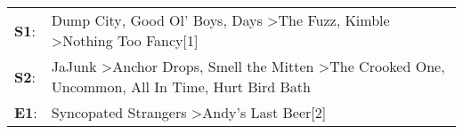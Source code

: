 \begin{supertabular}{p{0.03\textwidth}p{0.92\textwidth}}
 \textbf{S1}:  &                                                  Dump City\textsuperscript{}, \enspace Good Ol' Boys\textsuperscript{},  Days\textsuperscript{} \textgreater \enspace The Fuzz\textsuperscript{}, \enspace Kimble\textsuperscript{} \textgreater \enspace Nothing Too Fancy[1]\textsuperscript{}  \enspace  \\
 \textbf{S2}:  &  JaJunk\textsuperscript{} \textgreater \enspace Anchor Drops\textsuperscript{}, \enspace Smell the Mitten\textsuperscript{} \textgreater \enspace The Crooked One\textsuperscript{}, \enspace Uncommon\textsuperscript{}, \enspace All In Time\textsuperscript{}, \enspace Hurt Bird Bath\textsuperscript{}  \enspace  \\
 \textbf{E1}:  &                                                                                                                                                                                                          Syncopated Strangers\textsuperscript{} \textgreater \enspace Andy's Last Beer[2]\textsuperscript{}  \enspace  \\
\end{supertabular}
